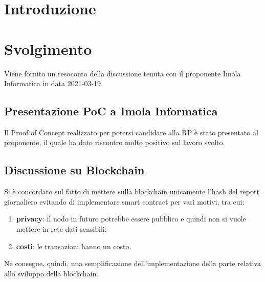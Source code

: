 \section*{Introduzione}

\section{Svolgimento}
Viene fornito un resoconto della discussione tenuta con il proponente Imola Informatica in data 2021-03-19.

\subsection*{Presentazione PoC a Imola Informatica}
Il Proof of Concept realizzato per potersi candidare alla RP è stato presentato al proponente, il quale ha dato riscontro molto positivo sul lavoro svolto.

\subsection*{Discussione su Blockchain}
Si è concordato sul fatto di mettere sulla blockchain unicamente l'hash del report giornaliero evitando di implementare smart contract per vari motivi, tra cui:
\begin{enumerate}
	\item \textbf{privacy}: il nodo in futuro potrebbe essere pubblico e quindi non si vuole mettere in rete dati sensibili;
	\item \textbf{costi}: le transazioni hanno un costo.
\end{enumerate}
Ne consegue, quindi, una semplificazione dell'implementazione della parte relativa allo sviluppo della blockchain.





